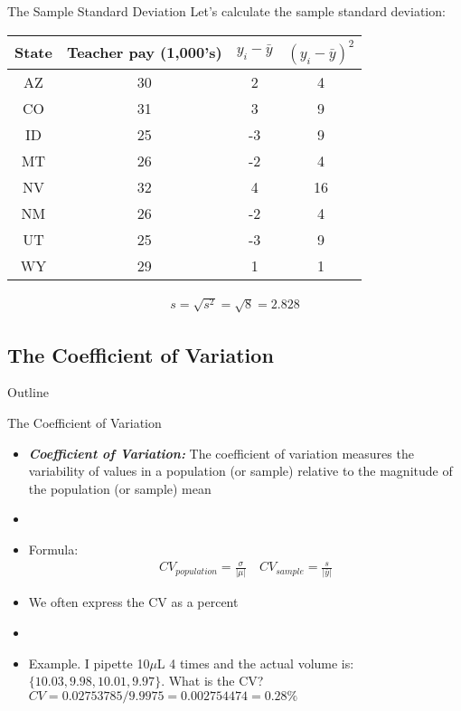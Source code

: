 \documentclass[xcolor=dvipsnames]{beamer}
\begin{document}
\begin{frame}{The Sample Standard Deviation}
	Let's calculate the sample standard deviation:
	\begin{center}
		\begin{tabular}{|c|c|c|c|}
			\hline 
			\textbf{State} & \textbf{Teacher pay (1,000's)} &  $y_i-\bar{y}$ & $(y_i-\bar{y})^2$\\ 
			\hline \hline
			AZ & 30 & 2 &4\\ \hline 
			CO &  31 & 3 &9\\ \hline 
			ID & 25  & -3 &9\\  \hline 
			MT &  26 & -2 &4\\ \hline 
			NV & 32 & 4 &16\\ \hline 
			NM &  26 & -2 &4\\ \hline 
			UT &  25 & -3 &9\\ \hline 
			WY &  29 & 1 &1\\ \hline 
		\end{tabular} 
	\end{center}
	\begin{gather*}
	s = \sqrt{s^2} = \sqrt{8} = 2.828
	\end{gather*}
\end{frame}

\subsection{The Coefficient of Variation}
\begin{frame}{Outline}
	\tableofcontents[currentsection,subsectionstyle=show/shaded/hide]
\end{frame}

\begin{frame}{The Coefficient of Variation}
	\begin{itemize}
		\item \textbf{\emph{Coefficient of Variation:}} The coefficient of variation measures the variability of values in a population (or sample) relative to the magnitude of the population (or sample) mean \pause
		\item[]
		\item Formula:
		\begin{align*}
			CV_{population} = \frac{\sigma}{|\mu|} \quad CV_{sample} = \frac{s}{|\bar{y}|}
		\end{align*}\pause
		\item We often express the CV as a percent\pause
		\item[]
		\item Example. I pipette 10$\mu$L 4 times and the actual volume is: $\{10.03, 9.98, 10.01, 9.97\}$. What is the CV? $CV = 0.02753785 / 9.9975 = 0.002754474 = 0.28 \%$
	\end{itemize}
\end{frame}
\end{document}
